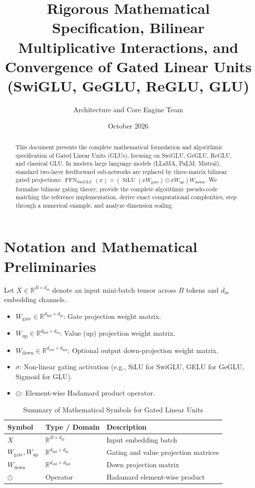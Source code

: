 \documentclass[11pt,a4paper]{article}
\title{\textbf{Rigorous Mathematical Specification, Bilinear Multiplicative Interactions, and Convergence of Gated Linear Units (SwiGLU, GeGLU, ReGLU, GLU)}}
\author{Architecture and Core Engine Team}
\date{October 2026}
\theoremstyle{definition}
\begin{document}
\maketitle

\begin{abstract}
This document presents the complete mathematical formulation and algorithmic specification of Gated Linear Units (GLUs), focusing on SwiGLU, GeGLU, ReGLU, and classical GLU. In modern large language models (LLaMA, PaLM, Mistral), standard two-layer feedforward sub-networks are replaced by three-matrix bilinear gated projections: $\operatorname{FFN}_{\text{SwiGLU}}(x) = (\operatorname{SiLU}(x W_{\text{gate}}) \odot x W_{\text{up}}) W_{\text{down}}$. We formalize bilinear gating theory, provide the complete algorithmic pseudo-code matching the reference implementation, derive exact computational complexities, step through a numerical example, and analyze dimension scaling.
\end{abstract}

\section{Notation and Mathematical Preliminaries}

Let $X \in \mathbb{R}^{B \times d_{\text{in}}}$ denote an input mini-batch tensor across $B$ tokens and $d_{\text{in}}$ embedding channels.

\begin{itemize}
    \item $W_{\text{gate}} \in \mathbb{R}^{d_{\text{hid}} \times d_{\text{in}}}$: Gate projection weight matrix.
    \item $W_{\text{up}} \in \mathbb{R}^{d_{\text{hid}} \times d_{\text{in}}}$: Value (up) projection weight matrix.
    \item $W_{\text{down}} \in \mathbb{R}^{d_{\text{out}} \times d_{\text{hid}}}$: Optional output down-projection weight matrix.
    \item $\sigma$: Non-linear gating activation (e.g., SiLU for SwiGLU, GELU for GeGLU, Sigmoid for GLU).
    \item $\odot$: Element-wise Hadamard product operator.
\end{itemize}

\begin{table}[h]
\centering
\caption{Summary of Mathematical Symbols for Gated Linear Units}
\begin{tabular}{lll}
\toprule
\textbf{Symbol} & \textbf{Type / Domain} & \textbf{Description} \\
\midrule
$X$ & $\mathbb{R}^{B \times d_{\text{in}}}$ & Input embedding batch \\
$W_{\text{gate}}, W_{\text{up}}$ & $\mathbb{R}^{d_{\text{hid}} \times d_{\text{in}}}$ & Gating and value projection matrices \\
$W_{\text{down}}$ & $\mathbb{R}^{d_{\text{out}} \times d_{\text{hid}}}$ & Down projection matrix \\
$\odot$ & Operator & Hadamard element-wise product \\
\bottomrule
\end{tabular}
\end{table}
\end{document}
